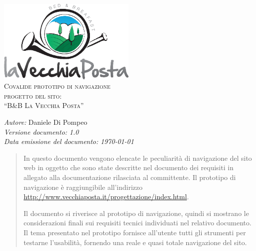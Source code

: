 \documentclass[a4paper,12pt,hidelinks]{report}
\begin{document}
  \begin{titlepage}
    \begin{center}
      \includegraphics[width=0.5\textwidth,keepaspectratio=true]{../img/logo}\\[1cm]    
      \textsc{\LARGE Covalide prototipo di navigazione}\\[0.6cm]
      \textsc{\LARGE  progetto del sito:\\[0.5cm] ``B\&B La Vecchia Posta''}\\ [2.0cm]

      \begin{minipage}{0.8\textwidth}
	\begin{flushleft} \large
	  \emph{Autore:} Daniele Di Pompeo \\[0.5cm]
	  \emph{Versione documento: 1.0}\\[0.5cm]
	  \emph{Data emissione del documento: \today}\\[0.5cm]
	\end{flushleft}
      \end{minipage}
    \end{center}
  \end{titlepage}

 
\begin{abstract}
 In questo documento vengono elencate le peculiarità di navigazione del sito web in oggetto che sono state descritte nel documento dei requisiti in allegato
 alla documentazione rilasciata al committente.
 Il prototipo di navigazione è raggiungibile all'indirizzo \url{http://www.vecchiaposta.it/progettazione/index.html}.
 \par Il documento si riverisce al prototipo di navigazione, quindi si mostrano le considerazioni finali sui requisiti tecnici individuati nel relativo documento.
 Il tema presentato nel prototipo fornisce all'utente tutti gli strumenti per testarne l'usabilità, fornendo una reale e quasi totale navigazione del sito.
\end{abstract}
\end{document}
